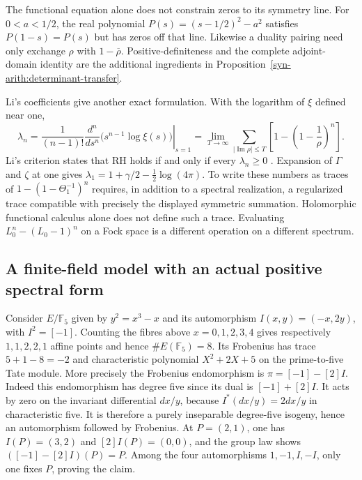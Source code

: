The functional equation alone does not constrain zeros to its symmetry
line.  For $0<a<1/2$, the real polynomial
$P(s)=(s-1/2)^2-a^2$ satisfies $P(1-s)=P(s)$ but has zeros off that line.
Likewise a duality pairing need only exchange $\rho$ with $1-\overline\rho$.
Positive-definiteness and the complete adjoint-domain identity are the
additional ingredients in Proposition~\ref{syn-arith:determinant-transfer}.

Li's coefficients give another exact formulation.  With the logarithm of
$\xi$ defined near one,
\[
 \lambda_n=\left.\frac1{(n-1)!}\frac{d^n}{ds^n}
                  \bigl(s^{n-1}\log\xi(s)\bigr)\right|_{s=1}
 =\lim_{T\to\infty}\sum_{|\operatorname{Im}\rho|\leq T}
       \left[1-\left(1-\frac1\rho\right)^n\right].
\]
Li's criterion states that RH holds if and only if every $\lambda_n\geq0$
\cite{syn-arith:Li}.
Expansion of $\Gamma$ and $\zeta$ at one gives
$\lambda_1=1+\gamma/2-\tfrac12\log(4\pi)$.
To write these numbers as traces of
$1-(1-\Theta_1^{-1})^n$ requires, in addition to a spectral realization,
a regularized trace compatible with precisely the displayed symmetric
summation.  Holomorphic functional calculus alone does not define such a
trace.  Evaluating $L_0^n-(L_0-1)^n$ on a Fock space is a different
operation on a different spectrum.

\subsection{A finite-field model with an actual positive spectral form}
\label{syn-arith:finite-field}
Consider $E/\mathbb F_5$ given by $y^2=x^3-x$ and its automorphism
$I(x,y)=(-x,2y)$, with $I^2=[-1]$.
Counting the fibres above $x=0,1,2,3,4$ gives respectively
$1,1,2,2,1$ affine points and hence $\#E(\mathbb F_5)=8$.
Its Frobenius has trace $5+1-8=-2$ and characteristic polynomial
$X^2+2X+5$ on the prime-to-five Tate module.
More precisely the Frobenius endomorphism is $\pi=[-1]-[2]I$.
Indeed this endomorphism has degree five since its dual is $[-1]+[2]I$.
It acts by zero on the invariant differential $dx/y$, because
$I^*(dx/y)=2dx/y$ in characteristic five.
It is therefore a purely inseparable degree-five isogeny, hence an
automorphism followed by Frobenius.
At $P=(2,1)$, one has $I(P)=(3,2)$ and $[2]I(P)=(0,0)$, and the group law
shows $([-1]-[2]I)(P)=P$.
Among the four automorphisms $1,-1,I,-I$, only one fixes $P$, proving the
claim.

